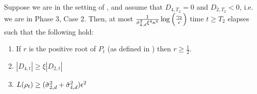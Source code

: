 \begin{lemma} \label{lemma:phase3_case2_rootlarge_time}
Suppose we are in the setting of , and assume that $D_{4, T_2} = 0$ and $D_{2, T_2} < 0$, i.e. we are in Phase 3, Case 2. Then, at most $\frac{1}{\hat{\sigma}_{2, d}^2 \xi^4 \kappa^6} \log\Big(\frac{\gamma_2}{\epsilon}\Big)$ time $t \geq T_2$ elapses such that the following hold:
\begin{enumerate}
    \item If $r$ is the positive root of $P_t$ (as defined in ) then $r \geq \frac{1}{2}$.
    \item $|D_{4, t}| \geq \xi |D_{2, t}|$
    \item $L(\rho_t) \geq (\hat{\sigma}_{2, d}^2 + \hat{\sigma}_{4, d}^2) \epsilon^2$
\end{enumerate}
\end{lemma}
